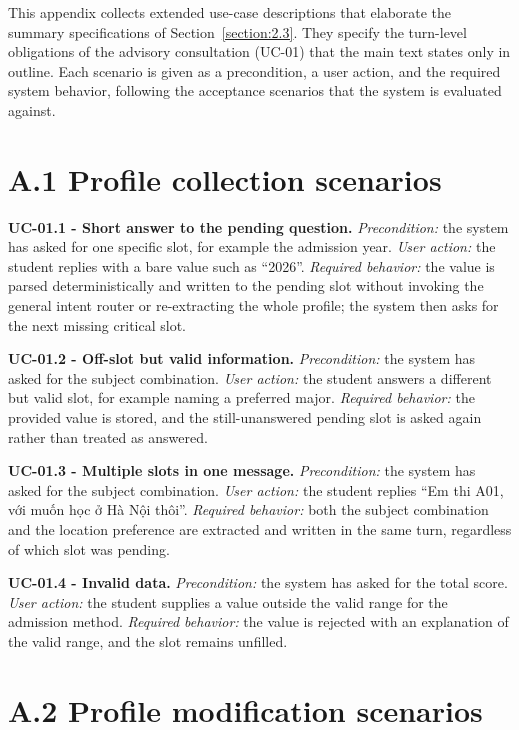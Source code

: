 \documentclass[../main.tex]{subfiles}
\begin{document}
This appendix collects extended use-case descriptions that elaborate the summary specifications of Section~\ref{section:2.3}.
They specify the turn-level obligations of the advisory consultation (UC-01) that the main text states only in outline.
Each scenario is given as a precondition, a user action, and the required system behavior, following the acceptance scenarios that the system is evaluated against.

\section*{A.1 Profile collection scenarios}

\textbf{UC-01.1 - Short answer to the pending question.}
\textit{Precondition:} the system has asked for one specific slot, for example the admission year.
\textit{User action:} the student replies with a bare value such as ``2026''.
\textit{Required behavior:} the value is parsed deterministically and written to the pending slot without invoking the general intent router or re-extracting the whole profile; the system then asks for the next missing critical slot.

\textbf{UC-01.2 - Off-slot but valid information.}
\textit{Precondition:} the system has asked for the subject combination.
\textit{User action:} the student answers a different but valid slot, for example naming a preferred major.
\textit{Required behavior:} the provided value is stored, and the still-unanswered pending slot is asked again rather than treated as answered.

\textbf{UC-01.3 - Multiple slots in one message.}
\textit{Precondition:} the system has asked for the subject combination.
\textit{User action:} the student replies ``Em thi A01, với muốn học ở Hà Nội thôi''.
\textit{Required behavior:} both the subject combination and the location preference are extracted and written in the same turn, regardless of which slot was pending.

\textbf{UC-01.4 - Invalid data.}
\textit{Precondition:} the system has asked for the total score.
\textit{User action:} the student supplies a value outside the valid range for the admission method.
\textit{Required behavior:} the value is rejected with an explanation of the valid range, and the slot remains unfilled.

\section*{A.2 Profile modification scenarios}
\end{document}
